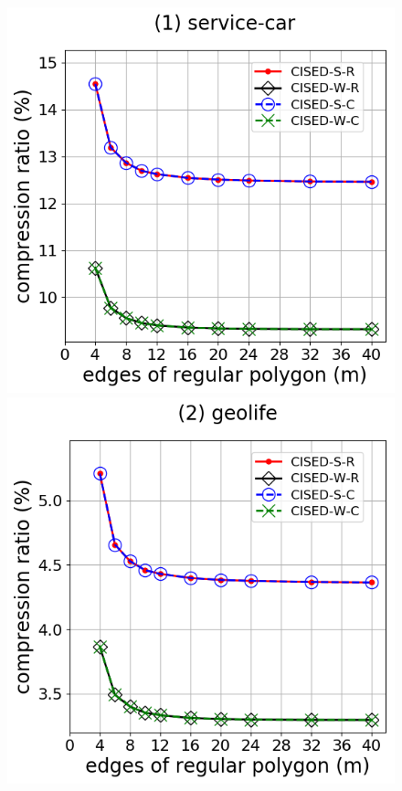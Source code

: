 \begin{figure}[tb!]
\centering
\includegraphics[scale = 0.275]{Figures/Exp-M-e-60-CR-service.png}\hspace{3ex}
\includegraphics[scale = 0.275]{Figures/Exp-M-e-60-CR-geolife.png}\hspace{3ex}

\end{figure}
